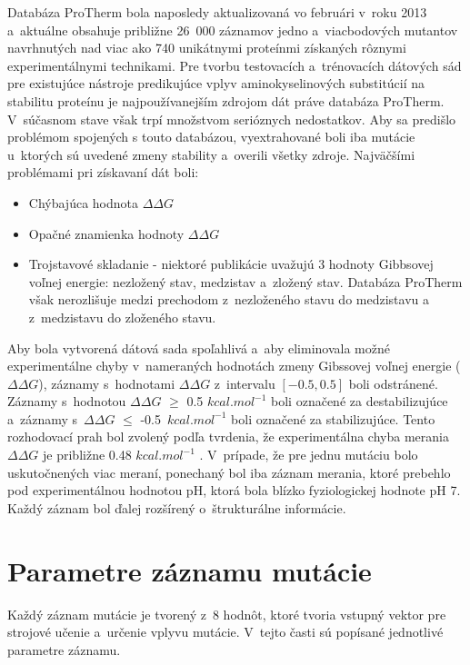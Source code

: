 Databáza ProTherm bola naposledy aktualizovaná vo februári v~roku 2013 a~aktuálne obsahuje približne 26 000 záznamov jedno a~viacbodových mutantov navrhnutých nad viac ako 740 unikátnymi proteínmi získaných rôznymi experimentálnymi technikami. Pre tvorbu testovacích a~trénovacích dátových sád pre existujúce nástroje predikujúce vplyv aminokyselinových substitúcií na stabilitu proteínu je najpoužívanejším zdrojom dát práve databáza ProTherm. V~súčasnom stave však trpí množstvom serióznych nedostatkov. Aby sa predišlo problémom spojených s touto databázou, vyextrahované boli iba mutácie u~ktorých sú uvedené zmeny stability a~overili všetky zdroje. Najväčšími problémami pri získavaní dát boli:
\begin{itemize}
	\item Chýbajúca hodnota $\Delta\Delta G$
	\item Opačné znamienka hodnoty $\Delta\Delta G$ 
	\item Trojstavové skladanie - niektoré publikácie uvažujú 3 hodnoty Gibbsovej voľnej energie: nezložený stav, medzistav a~zložený stav. Databáza ProTherm však nerozlišuje medzi prechodom z~nezloženého stavu do medzistavu a z~medzistavu do zloženého stavu.
\end{itemize}

Aby bola vytvorená dátová sada spoľahlivá a~aby eliminovala možné experimentálne chyby v~nameraných hodnotách zmeny Gibssovej voľnej energie ($\Delta\Delta G$), záznamy s~hodnotami $\Delta\Delta G$ z~intervalu $\left[-0.5,0.5\right]$ boli odstránené. Záznamy s~hodnotou $\Delta\Delta G$ $\geq$ 0.5 $kcal.mol^{-1}$ boli označené za destabilizujúce a~záznamy s~$\Delta\Delta G$ $\leq$ -0.5~$kcal.mol^{-1}$ boli označené za stabilizujúce. Tento rozhodovací prah bol zvolený podľa tvrdenia, že experimentálna chyba merania $\Delta\Delta G$ je približne 0.48 $kcal.mol^{-1}$ \cite{threshold}.
V~prípade, že pre jednu mutáciu bolo uskutočnených viac meraní, ponechaný bol iba záznam merania, ktoré prebehlo pod experimentálnou hodnotou pH, ktorá bola blízko fyziologickej hodnote pH 7. Každý záznam bol ďalej rozšírený o~štrukturálne informácie.

\section{Parametre záznamu mutácie}

Každý záznam mutácie je tvorený z~8 hodnôt, ktoré tvoria vstupný vektor pre strojové učenie a~určenie vplyvu mutácie. V~tejto časti sú popísané jednotlivé parametre záznamu.

